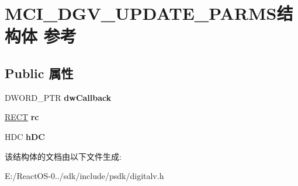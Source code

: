 \hypertarget{struct_m_c_i___d_g_v___u_p_d_a_t_e___p_a_r_m_s}{}\section{M\+C\+I\+\_\+\+D\+G\+V\+\_\+\+U\+P\+D\+A\+T\+E\+\_\+\+P\+A\+R\+M\+S结构体 参考}
\label{struct_m_c_i___d_g_v___u_p_d_a_t_e___p_a_r_m_s}
\subsection*{Public 属性}
\begin{DoxyCompactItemize}
\item 
\mbox{\label{struct_m_c_i___d_g_v___u_p_d_a_t_e___p_a_r_m_s_a87cdb564942d45fd052d5834d853d2f9}} 
D\+W\+O\+R\+D\+\_\+\+P\+TR {\bfseries dw\+Callback}
\item 
\mbox{\label{struct_m_c_i___d_g_v___u_p_d_a_t_e___p_a_r_m_s_a3261eb9cc0f8363a3c319c7b073c8fbf}} 
\hyperlink{structtag_r_e_c_t}{R\+E\+CT} {\bfseries rc}
\item 
\mbox{\label{struct_m_c_i___d_g_v___u_p_d_a_t_e___p_a_r_m_s_a2bd45fc5261d6274953b923679e6c422}} 
H\+DC {\bfseries h\+DC}
\end{DoxyCompactItemize}


该结构体的文档由以下文件生成\+:\begin{DoxyCompactItemize}
\item 
E\+:/\+React\+O\+S-\/0../sdk/include/psdk/digitalv.\+h\end{DoxyCompactItemize}
